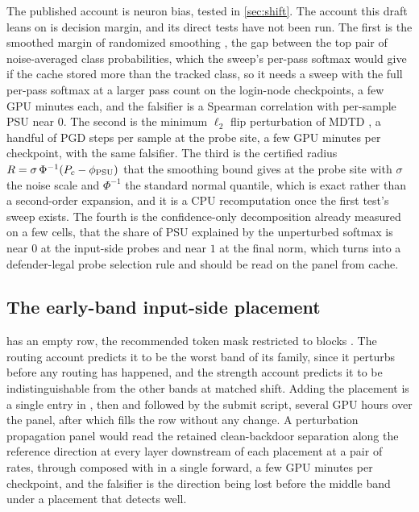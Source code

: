 \documentclass[../main.tex]{subfiles}
\begin{document}
The published account is neuron bias, tested in \cref{sec:shift}. The account this draft leans on is decision margin, and its direct tests have not been run. The first is the smoothed margin of randomized smoothing \citep{cohen2019smoothing}, the gap between the top pair of noise-averaged class probabilities, which the sweep's per-pass softmax would give if the cache stored more than the tracked class, so it needs a sweep with the full per-pass softmax at a larger pass count on the login-node checkpoints, a few GPU minutes each, and the falsifier is a Spearman correlation with per-sample PSU near $0$. The second is the minimum $\ell_2$ flip perturbation of MDTD \citep{rajabi2023mdtd}, a handful of PGD steps per sample at the probe site, a few GPU minutes per checkpoint, with the same falsifier. The third is the certified radius $R = \sigma\,\Phi^{-1}(P_c - \phi_{\mathrm{PSU}})$ that the smoothing bound gives at the probe site with $\sigma$ the noise scale and $\Phi^{-1}$ the standard normal quantile, which is exact rather than a second-order expansion, and it is a CPU recomputation once the first test's sweep exists. The fourth is the confidence-only decomposition already measured on a few cells, that the share of PSU explained by the unperturbed softmax is near $0$ at the input-side probes and near $1$ at the final norm, which turns into a defender-legal probe selection rule and should be read on the panel from cache.

\subsection{The early-band input-side placement}

 has an empty row, the recommended token mask restricted to blocks \BandEarly{}. The routing account predicts it to be the worst band of its family, since it perturbs before any routing has happened, and the strength account predicts it to be indistinguishable from the other bands at matched shift. Adding the placement is a single entry in , then  and  followed by the submit script, several GPU hours over the panel, after which  fills the row without any change. A perturbation propagation panel would read the retained clean-backdoor separation along the reference direction at every layer downstream of each placement at a pair of rates, through  composed with  in a single forward, a few GPU minutes per checkpoint, and the falsifier is the direction being lost before the middle band under a placement that detects well.
\end{document}
